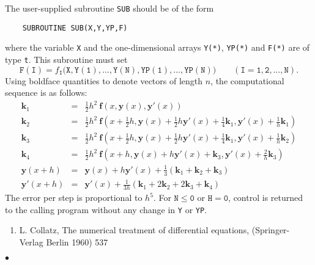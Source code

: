 The user-supplied subroutine {\tt SUB} should be of the form
\begin{verbatim}
    SUBROUTINE SUB(X,Y,YP,F)
\end{verbatim}
where the variable {\tt X} and the one-dimensional arrays {\tt Y(*)},
{\tt YP(*)} and {\tt F(*)} are of type {\tt t}.
This subroutine must set
$$\mathtt{F(I)} =
f_{\mathtt{I}}(\mathtt{X,Y(1),\ldots,Y(N),YP(1),\ldots,YP(N))}
\qquad (\mathtt{I = 1,2,\ldots,N}).$$
\newpage
\Method
Using boldface quantities to denote vectors of length $n$, the
computational sequence is as follows:
\begin{eqnarray*}
\mathbf{k}_1 & = & \frac{1}{2}h^2 \
\mathbf{f}(x,\mathbf{y}(x),\mathbf{y}'(x)) \\[2mm]
\mathbf{k}_2 & = & \frac{1}{2}h^2 \ \mathbf{f}(x+\frac{1}{2}h,
\mathbf{y}(x)+\frac{1}{2}h\mathbf{y}'(x)+\frac{1}{4}\mathbf{k}_1,
\mathbf{y}'(x)+\frac{1}{h}\mathbf{k}_1) \\[2mm]
\mathbf{k}_3 & = & \frac{1}{2}h^2 \ \mathbf{f}(x+\frac{1}{2}h,
\mathbf{y}(x)+\frac{1}{2}h\mathbf{y}'(x)+\frac{1}{4}\mathbf{k}_1,
\mathbf{y}'(x)+\frac{1}{h}\mathbf{k}_2) \\[2mm]
\mathbf{k}_4 & = & \frac{1}{2}h^2 \ \mathbf{f}(x+h,
\mathbf{y}(x)+h\mathbf{y}'(x)+\mathbf{k}_3,
\mathbf{y}'(x)+\frac{2}{h}\mathbf{k}_3)\\[2mm]
\mathbf{y}(x+h) & = & \mathbf{y}(x)+h\mathbf{y}'(x)+
\frac{1}{3} (\mathbf{k}_1 + \mathbf{k}_2 + \mathbf{k}_3)  \\[2mm]
\mathbf{y}'(x+h) & = & \mathbf{y}'(x)+
\frac{1}{3h} (\mathbf{k}_1 + 2\mathbf{k}_2 + 2\mathbf{k}_3+\mathbf{k}_4)
\end{eqnarray*}
The error per step is proportional to $h^5$.
\Errorh
For $\mathtt{N \le 0}$ or $\mathtt{H=0}$, control is returned to the
calling program without any change in {\tt Y} or {\tt YP}.
\Refer
\begin{enumerate}
\item  L. Collatz, The numerical treatment of differential equations,
(Springer-Verlag Berlin 1960) 537
\end{enumerate}
$\bullet$
